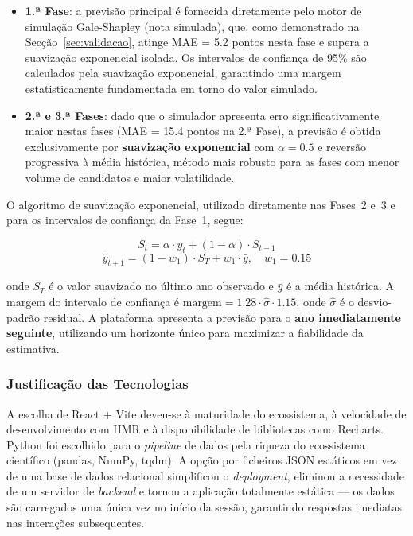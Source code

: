 \documentclass[12pt,a4paper]{article}
\begin{document}
\begin{itemize}[noitemsep]
  \item \textbf{1.ª Fase}: a previsão principal é fornecida diretamente pelo motor de simulação Gale-Shapley (nota simulada), que, como demonstrado na Secção~\ref{sec:validacao}, atinge MAE = 5.2 pontos nesta fase e supera a suavização exponencial isolada. Os intervalos de confiança de 95\% são calculados pela suavização exponencial, garantindo uma margem estatisticamente fundamentada em torno do valor simulado.
  \item \textbf{2.ª e 3.ª Fases}: dado que o simulador apresenta erro significativamente maior nestas fases (MAE = 15.4 pontos na 2.ª Fase), a previsão é obtida exclusivamente por \textbf{suavização exponencial} com $\alpha = 0.5$ e reversão progressiva à média histórica, método mais robusto para as fases com menor volume de candidatos e maior volatilidade.
\end{itemize}

O algoritmo de suavização exponencial, utilizado diretamente nas Fases~2 e~3 e para os intervalos de confiança da Fase~1, segue:

\begin{equation}
S_t = \alpha \cdot y_t + (1 - \alpha) \cdot S_{t-1}
\label{eq:smoothing}
\end{equation}
\begin{equation}
\hat{y}_{t+1} = (1 - w_1) \cdot S_T + w_1 \cdot \bar{y}, \quad w_1 = 0.15
\label{eq:prediction}
\end{equation}

onde $S_T$ é o valor suavizado no último ano observado e $\bar{y}$ é a média histórica. A margem do intervalo de confiança é $\text{margem} = 1.28 \cdot \hat{\sigma} \cdot 1.15$, onde $\hat{\sigma}$ é o desvio-padrão residual. A plataforma apresenta a previsão para o \textbf{ano imediatamente seguinte}, utilizando um horizonte único para maximizar a fiabilidade da estimativa.

\subsubsection{Justificação das Tecnologias}

A escolha de React + Vite deveu-se à maturidade do ecossistema, à velocidade de desenvolvimento com HMR e à disponibilidade de bibliotecas como Recharts. Python foi escolhido para o \textit{pipeline} de dados pela riqueza do ecossistema científico (pandas, NumPy, tqdm). A opção por ficheiros JSON estáticos em vez de uma base de dados relacional simplificou o \textit{deployment}, eliminou a necessidade de um servidor de \textit{backend} e tornou a aplicação totalmente estática --- os dados são carregados uma única vez no início da sessão, garantindo respostas imediatas nas interações subsequentes.
\end{document}
